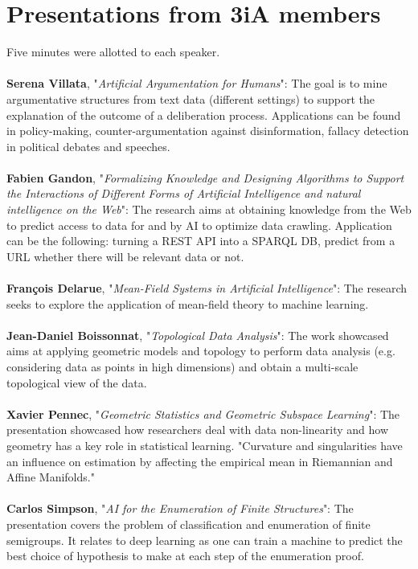 \documentclass[a4paper]{article}
\begin{document}
\section{Presentations from 3iA members}
Five minutes were allotted to each speaker.
\\\\
\textbf{Serena Villata}, "\textit{Artificial Argumentation for Humans}": The goal is to mine argumentative structures from text data (different settings) to support the explanation of the outcome of a deliberation process. Applications can be found in policy-making, counter-argumentation against disinformation, fallacy detection in political debates and speeches.
\\\\
\textbf{Fabien Gandon}, "\textit{Formalizing Knowledge and Designing Algorithms to Support the Interactions of Different Forms of Artificial Intelligence and natural intelligence on the Web}": The research aims at obtaining knowledge from the Web to predict access to data for and by AI to optimize data crawling. Application can be the following: turning a REST API into a SPARQL DB, predict from a URL whether there will be relevant data or not.
\\\\
\textbf{François Delarue}, "\textit{Mean-Field Systems in Artificial Intelligence}": The research seeks to explore the application of mean-field theory to machine learning.
\\\\
\textbf{Jean-Daniel Boissonnat}, "\textit{Topological Data Analysis}": The work showcased aims at applying geometric models and topology to perform data analysis (e.g. considering data as points in high dimensions) and obtain a multi-scale topological view of the data.
\\\\
\textbf{Xavier Pennec}, "\textit{Geometric Statistics and Geometric Subspace Learning}": The presentation showcased how researchers deal with data non-linearity and how geometry has a key role in statistical learning. "Curvature and singularities have an influence on estimation by affecting the empirical mean in Riemannian and Affine Manifolds."
\\\\
\textbf{Carlos Simpson}, "\textit{AI for the Enumeration of Finite Structures}": The presentation covers the problem of classification and enumeration of finite semigroups. It relates to deep learning as one can train a machine to predict the best choice of hypothesis to make at each step of the enumeration proof.
\end{document}
